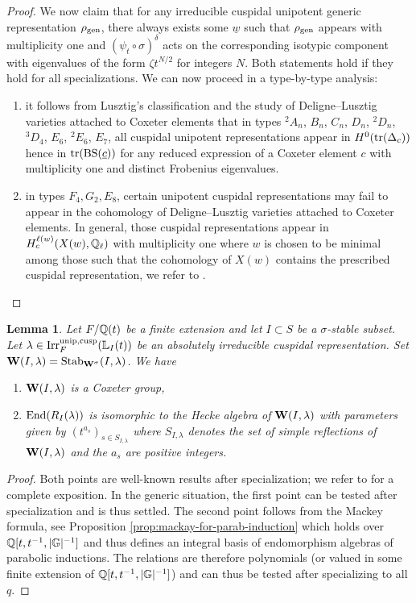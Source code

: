 \documentclass[a4paper, 10pt, oneside, reqno]{amsart}
\theoremstyle{plain}
\newtheorem{lem}[thm]{Lemma}
\theoremstyle{definition}
\theoremstyle{remark}
\newcommand{\Gbb}{\mathbb{G}}
\newcommand{\BS}{\mathrm{BS}}
\newcommand{\Lbb}{\mathbb{L}}
\begin{document}
\begin{proof}
We now claim that for any irreducible cuspidal unipotent generic representation $\rho_{\mathrm{gen}}$, there always exists some $\underline{w}$ such that $\rho_{\mathrm{gen}}$ appears with multiplicity one and $(\psi_t \circ \sigma)^{\delta}$ acts on the corresponding isotypic component with eigenvalues of the form $\zeta t^{N/2}$ for integers $N$. Both statements hold if they hold for all specializations. We can now proceed in a type-by-type analysis: 
\begin{enumerate}
\item it follows from Lusztig's classification \cite{LusztigBook} and the study of Deligne--Lusztig varieties attached to Coxeter elements \cite{LusztigCoxeterOrbit} that in types ${^2}A_n$, $B_n$, $C_n$, $D_n$, ${^2}D_n$, ${^3}D_4$, $E_6$, ${^2}E_6$, $E_7$, all cuspidal unipotent representations appear in $H^0(\mathrm{tr}(\Delta_c))$ hence in $\tr(\BS(\underline{c}))$ for any reduced expression of a Coxeter element $c$ with multiplicity one and distinct Frobenius eigenvalues. 
\item in types $F_4,G_2,E_8$, certain unipotent cuspidal representations may fail to appear in the cohomology of Deligne--Lusztig varieties attached to Coxeter elements. In general, those cuspidal representations appear in $H^{\ell(w)}_c(X(w), \mathbb{Q}_{\ell})$ with multiplicity one where $w$ is chosen to be minimal among those such that the cohomology of $X(w)$ contains the prescribed cuspidal representation, we refer to \cite{LusztigRationality}. 
\end{enumerate}
\end{proof}

\begin{lem}\label{lem:hecke-algebra-endomorphism}
Let $F/\mathbb{Q}(t)$ be a finite extension and let $I \subset S$ be a $\sigma$-stable subset. Let $\lambda \in \Irr_F^{\unip, \cusp}(\Lbb_I(t))$ be an absolutely irreducible cuspidal representation. Set $\mathbf{W}(I, \lambda) = \mathrm{Stab}_{\mathbf{W}^{\sigma}}(I,\lambda)$. We have 
\begin{enumerate}
\item $\mathbf{W}(I, \lambda)$ is a Coxeter group, 
\item $\mathrm{End}(R_I(\lambda))$ is isomorphic to the Hecke algebra of $\mathbf{W}(I, \lambda)$ with parameters given by $(t^{a_s})_{s \in S_{I,\lambda}}$ where $S_{I,\lambda}$ denotes the set of simple reflections of $\mathbf{W}(I, \lambda)$ and the $a_s$ are positive integers.
\end{enumerate}
\end{lem}

\begin{proof}
Both points are well-known results after specialization; we refer to \cite[Theorem 3.2.5]{GeckMalleBook} for a complete exposition. In the generic situation, the first point can be tested after specialization and is thus settled. The second point follows from the Mackey formula, see Proposition \ref{prop:mackay-for-parab-induction} which holds over $\Q[t,t^{-1}, |\Gbb|^{-1}]$ and thus defines an integral basis of endomorphism algebras of parabolic inductions. The relations are therefore polynomials (or valued in some finite extension of $\Q[t,t^{-1}, |\Gbb|^{-1}]$) and can thus be tested after specializing to all $q$. 
\end{proof}
\end{document}
